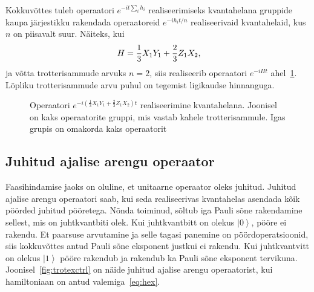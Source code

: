 \documentclass[12pt]{report}
\def\paren#1{\left(#1\right)}
\def\ket#1{\left|#1\right>}
\begin{document}
Kokkuvõttes tuleb operaatori \(e^{-i t \sum_i h_i}\) realiseerimiseks kvantahelana gruppide kaupa järjestikku rakendada operaatoreid \(e^{-i h_i t/n}\) realiseerivaid kvantahelaid, kus \(n\) on piisavalt suur.
Näiteks, kui
\begin{align}\label{eq:hex}
    H=\frac{1}{3}X_1Y_1+\frac{2}{3}Z_1X_2 \rlap{,}
\end{align}
ja võtta trotterisammude arvuks \(n = 2\), siis realiseerib operaatori \(e^{-i Ht}\) ahel~\ref{fig:trot}.
Lõpliku trotterisammude arvu puhul on tegemist ligikaudse hinnanguga.

\begin{figure}
    \centering
    \ifdefined\yquanton
    \fi
    \caption{Operaatori \(e^{-i\paren{\frac{1}{3}X_1Y_1+\frac{2}{3}Z_1X_2} t}\) realiseerimine kvantahelana.
    Joonisel on kaks operaatorite gruppi, mis vastab kahele trotterisammule.
    Igas grupis on omakorda kaks operaatorit}
    \label{fig:trot}
\end{figure}

\subsection{Juhitud ajalise arengu operaator}\label{sec:cu}

Faasihindamise jaoks on oluline, et unitaarne operaator oleks juhitud.
Juhitud ajalise arengu operaatori saab, kui seda realiseerivas kvantahelas asendada kõik pöörded juhitud pööretega.
Nõnda toiminud, sõltub iga Pauli sõne rakendamine sellest, mis on juhtkvantbiti olek.
Kui juhtkvantbitt on olekus \(\ket{0}\), pööre ei rakendu.
Et paarsuse arvutamine ja selle tagasi panemine on pöördoperatsioonid, siis kokkuvõttes antud Pauli sõne eksponent justkui ei rakendu.
Kui juhtkvantvitt on olekus \(\ket{1}\) pööre rakendub ja rakendub ka Pauli sõne eksponent tervikuna.
Joonisel~\ref{fig:trotexctrl} on näide juhitud ajalise arengu operaatorist, kui hamiltoniaan on antud valemiga~\eqref{eq:hex}.
\end{document}
